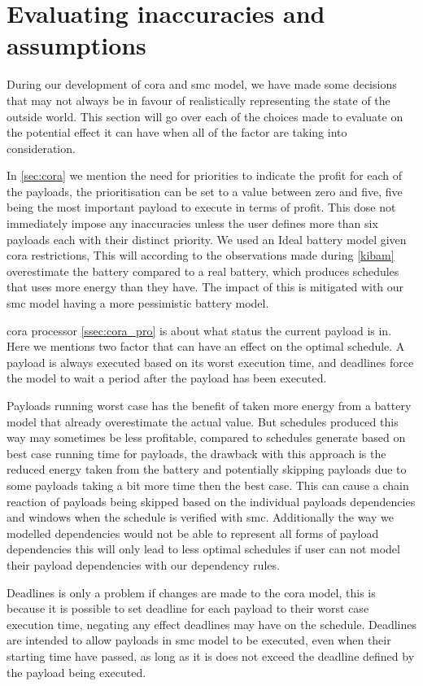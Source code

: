 \section{Evaluating inaccuracies and assumptions}
During our development of \gls{cora} and \gls{smc} model, we have made some decisions that may not always be in favour of realistically representing the state of the outside world. This section will go over each of the choices made to evaluate on the potential effect it can have when all of the factor are taking into consideration.

In \cref{sec:cora} we mention the need for priorities to indicate the profit for each of the payloads, the prioritisation can be set to a value between zero and five, five being the most important payload to execute in terms of profit. This dose not immediately impose any inaccuracies unless the user defines more than six payloads each with their distinct priority.
We used an Ideal battery model given \gls{cora} restrictions, This will according to the observations made during \cref{kibam} overestimate the battery compared to a real battery, which produces schedules that uses more energy than they have. The impact of this is mitigated with our \gls{smc} model having a more pessimistic battery model.

\gls{cora} processor \cref{ssec:cora_pro} is about what status the current payload is in. Here we mentions two factor that can have an effect on the optimal schedule. A payload is always executed based on its worst execution time, and deadlines force the model to wait a period after the payload has been executed. 

Payloads running worst case has the benefit of taken more energy from a battery model that already overestimate the actual value. But schedules produced this way may sometimes be less profitable, compared to schedules generate based on best case running time for payloads, the drawback with this approach is the reduced energy taken from the battery and potentially skipping payloads due to some payloads taking a bit more time then the best case. This can cause a chain reaction of payloads being skipped based on the individual payloads dependencies and windows when the schedule is verified with \gls{smc}. Additionally the way we modelled dependencies would not be able to represent all forms of payload dependencies this will only lead to less optimal schedules if user can not model their payload dependencies with our dependency rules.

Deadlines is only a problem if changes are made to the \gls{cora} model, this is because it is possible to set deadline for each payload to their worst case execution time, negating any effect deadlines may have on the schedule. Deadlines are intended to allow payloads in \gls{smc} model to be executed, even when their starting time have passed, as long as it is does not exceed the deadline defined by the payload being executed.

